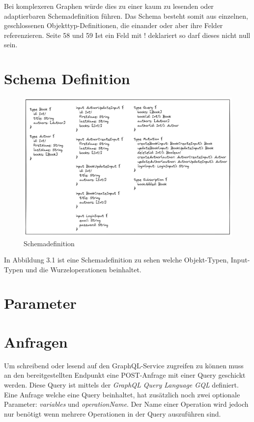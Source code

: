 Bei komplexeren Graphen würde dies zu einer kaum zu lesenden oder adaptierbaren Schemadefinition führen.
Das Schema besteht somit aus einzelnen, geschlossenen Objekttyp-Definitionen, die einander oder aber ihre Felder referenzieren. Seite 58 und 59
Ist ein Feld mit ! deklariert so darf dieses nicht null sein.

\section{Schema Definition}

\begin{figure}[H]
    \includegraphics[width=\textwidth]{pics/schema.png}
    \caption{Schemadefinition}
\end{figure}

In Abbildung 3.1 ist eine Schemadefinition zu sehen welche Objekt-Typen, Input-Typen und die Wurzeloperationen beinhaltet.

\section{Parameter}

\section{Anfragen}
Um schreibend oder lesend auf den GraphQL-Service zugreifen zu können muss an den bereitgestellten Endpunkt eine POST-Anfrage mit einer Query geschickt werden.
Diese Query ist mittels der \textit{GraphQL Query Language GQL} definiert.
Eine Anfrage welche eine Query beinhaltet, hat zusätzlich noch zwei optionale Parameter: \textit{variables} und \textit{operationName}.
Der Name einer Operation wird jedoch nur benötigt wenn mehrere Operationen in der Query auszuführen sind.

